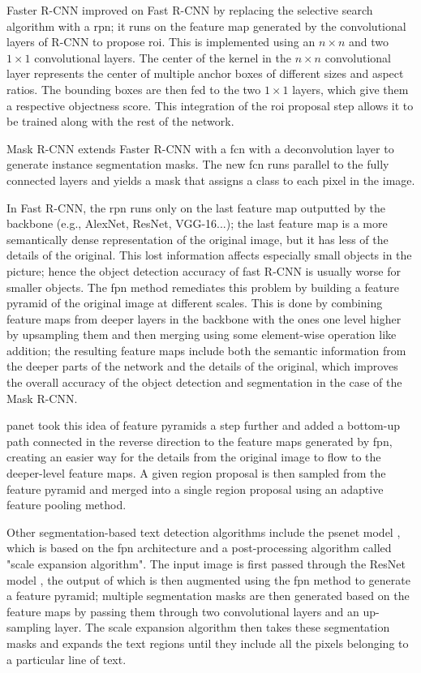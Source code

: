 Faster R-CNN \cite{ren_faster_2017} improved on Fast R-CNN by replacing the selective search algorithm with a \gls{rpn}; it runs on the feature map generated by the convolutional layers of R-CNN to propose \gls{roi}. This is implemented using an $n\times n$ and two $1\times 1$ convolutional layers. The center of the kernel in the $n \times n$ convolutional layer represents the center of multiple anchor boxes of different sizes and aspect ratios. The bounding boxes are then fed to the two $1\times 1$ layers, which give them a respective objectness score. This integration of the \gls{roi} proposal step allows it to be trained along with the rest of the network.

\label{maskrcnn}Mask R-CNN \cite{he_mask_2017} extends Faster R-CNN with a \gls{fcn} with a deconvolution layer to generate instance segmentation masks. The new \gls{fcn} runs parallel to the fully connected layers and yields a mask that assigns a class to each pixel in the image.

In Fast R-CNN, the \gls{rpn} runs only on the last feature map outputted by the backbone (e.g., AlexNet, ResNet, VGG-16...); the last feature map is a more semantically dense representation of the original image, but it has less of the details of the original. This lost information affects especially small objects in the picture; hence the object detection accuracy of fast R-CNN is usually worse for smaller objects. The \gls{fpn} method \cite{lin_feature_2017} remediates this problem by building a feature pyramid of the original image at different scales. This is done by combining feature maps from deeper layers in the backbone with the ones one level higher by upsampling them and then merging using some element-wise operation like addition; the resulting feature maps include both the semantic information from the deeper parts of the network and the details of the original, which improves the overall accuracy of the object detection and segmentation in the case of the Mask R-CNN.

\label{panet}\gls{panet} \cite{liu_path_2018} took this idea of feature pyramids a step further and added a bottom-up path connected in the reverse direction to the feature maps generated by \gls{fpn}, creating an easier way for the details from the original image to flow to the deeper-level feature maps. A given region proposal is then sampled from the feature pyramid and merged into a single region proposal using an adaptive feature pooling method.

\label{psenet}Other segmentation-based text detection algorithms include the \gls{psenet} model \cite{wang_shape_2019}, which is based on the \gls{fpn} architecture and a post-processing algorithm called "scale expansion algorithm". The input image is first passed through the ResNet model \cite{he_deep_2016}, the output of which is then augmented using the \gls{fpn} method to generate a feature pyramid; multiple segmentation masks are then generated based on the feature maps by passing them through two convolutional layers and an up-sampling layer. The scale expansion algorithm then takes these segmentation masks and expands the text regions until they include all the pixels belonging to a particular line of text.

